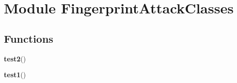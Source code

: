 %
%
%


\section{Module FingerprintAttackClasses}

    \label{FingerprintAttackClasses}


  \subsection{Functions}

    \label{FingerprintAttackClasses:test2}

    \vspace{0.5ex}

\hspace{.8\funcindent}\begin{boxedminipage}{\funcwidth}

    \raggedright \textbf{test2}()

\setlength{\parskip}{2ex}
\setlength{\parskip}{1ex}
    \end{boxedminipage}

    \label{FingerprintAttackClasses:test1}

    \vspace{0.5ex}

\hspace{.8\funcindent}\begin{boxedminipage}{\funcwidth}

    \raggedright \textbf{test1}()

\setlength{\parskip}{2ex}
\setlength{\parskip}{1ex}
    \end{boxedminipage}


